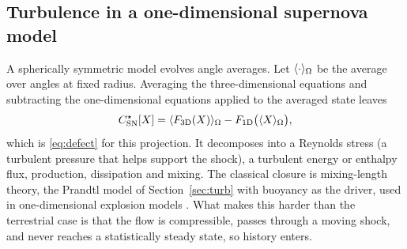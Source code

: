 \subsection{Turbulence in a one-dimensional supernova model}

A spherically symmetric model evolves angle averages. Let
$\langle \cdot \rangle_\Omega$ be the average over angles at fixed radius. Averaging
the three-dimensional equations and subtracting the one-dimensional
equations applied to the averaged state leaves
\begin{equation}
  C^\star_{\mathrm{SN}}[X]
  =\langle F_{3\mathrm D}(X) \rangle_\Omega-F_{1\mathrm D}\bigl(\langle X \rangle_\Omega\bigr),
\end{equation}
which is \eqref{eq:defect} for this projection. It decomposes into a
Reynolds stress (a turbulent pressure that helps support the shock), a
turbulent energy or enthalpy flux, production, dissipation and mixing. The
classical closure is mixing-length theory, the Prandtl model of
Section~\ref{sec:turb} with buoyancy as the driver, used in
one-dimensional explosion models \cite{CouchWarrenOConnor20}. What makes
this harder than the terrestrial case is that the flow is compressible,
passes through a moving shock, and never reaches a statistically steady
state, so history enters.
